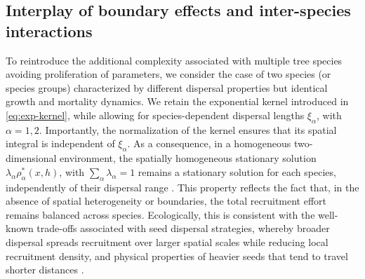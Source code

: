 \documentclass[aps,pre,twocolumn,superscriptaddress,10pt]{revtex4-2}
\begin{document}
\subsection*{Interplay of boundary effects and inter-species interactions}
To reintroduce the additional complexity associated with multiple tree species avoiding proliferation of parameters, we consider the case of two species (or species groups) characterized by different dispersal properties but identical growth and mortality dynamics.
We retain the exponential kernel introduced in \cref{eq:exp-kernel}, while allowing for species-dependent dispersal lengths $\xi_\alpha$, with $\alpha=1,2$. Importantly, the normalization of the kernel ensures that its spatial integral is independent of $\xi_\alpha$. As a consequence, in a homogeneous two-dimensional environment, the spatially homogeneous stationary solution $\lambda_\alpha \rho_\alpha^*(x, h)$, with $\sum_\alpha\lambda_\alpha=1$
remains a stationary solution for each species, independently of their dispersal range \MMnoref.
This property reflects the fact that, in the absence of spatial heterogeneity or boundaries, the total recruitment effort remains balanced across species. Ecologically, this is consistent with the well-known trade-offs associated with seed dispersal strategies, whereby broader dispersal spreads recruitment over larger spatial scales while reducing local recruitment density, and physical properties of heavier seeds that tend to travel shorter distances \cite{Nathan2000,Chen2020,Treep2021}.
\end{document}
